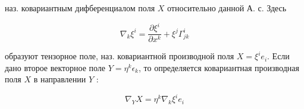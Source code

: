 \documentclass[10pt]{article}
\begin{document}
наз. ковариантным дифберенциалом поля $X$ относительно данной А. с. Здесь



\[

\nabla_{k} \xi^{i}=\frac{\partial \xi^{i}}{\partial x^{k}}+\xi^{j} \Gamma_{j k}^{i}

\]



образуют тензорное поле, наз. ковариантной производной поля $X=\xi^{i} e_{i}$. Если дано второе векторное поле $Y=\eta^{k} \epsilon_{k}$, то определяется ковариантная производная поля $X$ в направлении $Y$ :



\[

\nabla_{Y} X=\eta^{k} \nabla_{k} \xi^{i} e_{i}

\]
\end{document}
